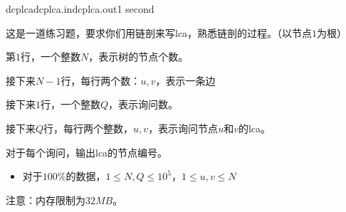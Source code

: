 \documentclass[11pt,a4paper,oneside]{article}
\begin{document}
\begin{problem}{dcplca}{dcplca.in}{dcplca.out}{1 second}
	
	这是一道练习题，要求你们用链剖来写lca，熟悉链剖的过程。（以节点$1$为根）
	
	\InputFile
	
	第$1$行，一个整数$N$，表示树的节点个数。
	
	接下来$N - 1$行，每行两个数：$u, v$，表示一条边
	
	接下来$1$行，一个整数$Q$，表示询问数。
	
	接下来$Q$行，每行两个整数，$u, v$，表示询问节点$u$和$v$的lca。
	
	\OutputFile
	
	对于每个询问，输出lca的节点编号。
	
	\Example
	
	\begin{example}
\end{example}

\Note

\begin{itemize}
	\item 对于$100\%$的数据，$1 \leq N, Q \leq 10^5$，$1 \leq u, v \leq N$
\end{itemize}
注意：内存限制为$32MB$。

\end{problem}
\end{document}
